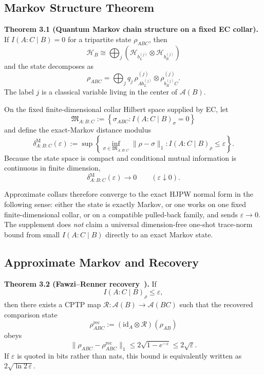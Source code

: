 \subsection{Markov Structure Theorem}\label{32-markov-structure-theorem}

\textbf{Theorem 3.1 (Quantum Markov chain structure on a fixed EC collar).} If \(I(A:C\mid B)=0\) for a tripartite state \(\rho_{ABC}\), then
\[
\mathcal H_B
\cong
\bigoplus_j
\left(
\mathcal H_{b_L^{(j)}}\otimes \mathcal H_{b_R^{(j)}}
\right)
\]
and the state decomposes as
\[
\rho_{ABC}
=
\bigoplus_j
q_j\,
\rho^{(j)}_{A b_L^{(j)}}\otimes \rho^{(j)}_{b_R^{(j)} C}.
\]
The label \(j\) is a classical variable living in the center of \(\mathcal A(B)\).

On the fixed finite-dimensional collar Hilbert space supplied by EC, let
\[
\mathfrak M_{A:B:C}
:=
\left\{
\sigma_{ABC}: I(A:C\mid B)_\sigma=0
\right\}
\]
and define the exact-Markov distance modulus
\[
\delta^{\mathrm M}_{A:B:C}(\varepsilon)
:=
\sup\left\{
\inf_{\sigma\in\mathfrak M_{A:B:C}}\|\rho-\sigma\|_1:
I(A:C\mid B)_\rho\le\varepsilon
\right\}.
\]
Because the state space is compact and conditional mutual information is continuous in finite dimension,
\[
\delta^{\mathrm M}_{A:B:C}(\varepsilon)\longrightarrow0
\qquad
(\varepsilon\downarrow0).
\]

Approximate collars therefore converge to the exact HJPW normal form in the following sense:
either the state is exactly Markov, or one works on one fixed finite-dimensional collar, or on a
compatible pulled-back family, and sends \(\varepsilon\to0\). The supplement does \emph{not}
claim a universal dimension-free one-shot trace-norm bound from small \(I(A:C\mid B)\) directly
to an exact Markov state.

\subsection{Approximate Markov and Recovery}\label{33-approximate-markov-and-recovery}

\textbf{Theorem 3.2 (Fawzi--Renner recovery~\cite{fawziRenner15}).} If
\[
I(A:C\mid B)_\rho\le\varepsilon,
\]
then there exists a CPTP map \(\mathcal R:\mathcal A(B)\to\mathcal A(BC)\) such that the recovered comparison state
\[
\rho^{\mathrm{rec}}_{ABC}
:=
(\mathrm{id}_A\otimes\mathcal R)(\rho_{AB})
\]
obeys
\[
\|\rho_{ABC}-\rho^{\mathrm{rec}}_{ABC}\|_1
\le
2\sqrt{1-e^{-\varepsilon}}
\le
2\sqrt{\varepsilon}.
\]
If \(\varepsilon\) is quoted in bits rather than nats, this bound is equivalently written as \(2\sqrt{\ln 2\,\varepsilon}\).

